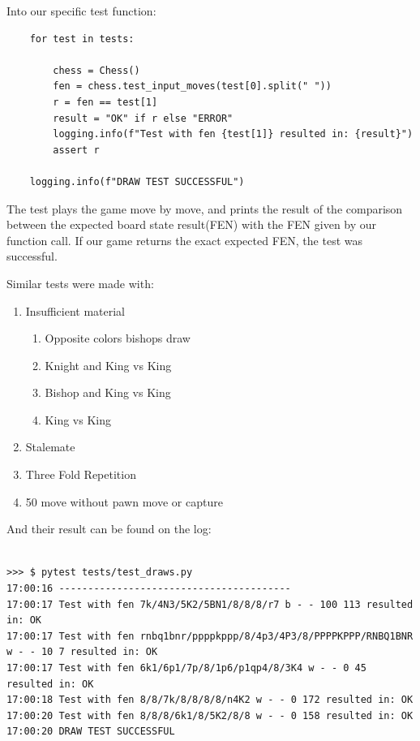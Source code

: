 \documentclass[10pt]{article}
\begin{document}
Into our specific test function:

\begin{lstlisting}
    for test in tests:

        chess = Chess()
        fen = chess.test_input_moves(test[0].split(" "))
        r = fen == test[1]
        result = "OK" if r else "ERROR"
        logging.info(f"Test with fen {test[1]} resulted in: {result}")
        assert r

    logging.info(f"DRAW TEST SUCCESSFUL")

\end{lstlisting}

The test plays the game move by move, and prints the result of the comparison between the expected board state
result(FEN) with the FEN given by our function call. If our game returns the
exact expected FEN, the test was successful.

Similar tests were made with:
\begin{enumerate}[label=\arabic*)]
\item Insufficient material
    \begin{enumerate}[label=\arabic{enumii}.\arabic*)]
    \item Opposite colors bishops draw
    \item Knight and King vs King
    \item Bishop and King vs King
    \item King vs King
    \end{enumerate}
    
    \item Stalemate 
    \item Three Fold Repetition
    \item 50 move without pawn move or capture
\end{enumerate}

And their result can be found on the log:
\begin{lstlisting}

>>> $ pytest tests/test_draws.py
17:00:16 ----------------------------------------
17:00:17 Test with fen 7k/4N3/5K2/5BN1/8/8/8/r7 b - - 100 113 resulted in: OK
17:00:17 Test with fen rnbq1bnr/ppppkppp/8/4p3/4P3/8/PPPPKPPP/RNBQ1BNR w - - 10 7 resulted in: OK
17:00:17 Test with fen 6k1/6p1/7p/8/1p6/p1qp4/8/3K4 w - - 0 45 resulted in: OK
17:00:18 Test with fen 8/8/7k/8/8/8/8/n4K2 w - - 0 172 resulted in: OK
17:00:20 Test with fen 8/8/8/6k1/8/5K2/8/8 w - - 0 158 resulted in: OK
17:00:20 DRAW TEST SUCCESSFUL

\end{lstlisting}
\end{document}
